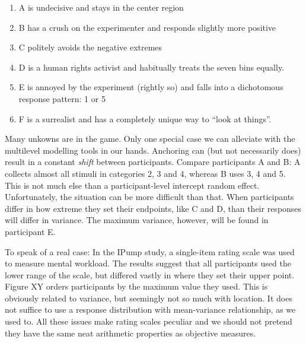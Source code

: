 \documentclass[]{svmono}
\providecommand{\tightlist}{%
  \setlength{\itemsep}{0pt}\setlength{\parskip}{0pt}}
\begin{document}
\begin{enumerate}
\def\labelenumi{\arabic{enumi}.}
\tightlist
\item
  A is undecisive and stays in the center region
\item
  B has a crush on the experimenter and responds slightly more positive
\item
  C politely avoids the negative extremes
\item
  D is a human rights activist and habitually treats the seven bins
  equally.
\item
  E is annoyed by the experiment (rightly so) and falls into a
  dichotomous response pattern: 1 or 5
\item
  F is a surrealist and has a completely unique way to ``look at
  things''.
\end{enumerate}

Many unkowns are in the game. Only one special case we can alleviate
with the multilevel modelling tools in our hands. Anchoring can (but not
necessarily does) result in a constant \emph{shift} between
participants. Compare participants A and B: A collects almost all
stimuli in categories 2, 3 and 4, whereas B uses 3, 4 and 5. This is not
much else than a participant-level intercept random effect.
Unfortunately, the situation can be more difficult than that. When
participants differ in how extreme they set their endpoints, like C and
D, than their responses will differ in variance. The maximum variance,
however, will be found in participant E.

To speak of a real case: In the IPump study, a single-item rating scale
was used to measure mental workload. The results suggest that all
participants used the lower range of the scale, but differed vastly in
where they set their upper point. Figure XY orders participants by the
maximum value they used. This is obviously related to variance, but
seemingly not so much with location. It does not suffice to use a
response distribution with mean-variance relationship, as we used to.
All these issues make rating scales peculiar and we should not pretend
they have the same neat arithmetic properties as objective measures.
\end{document}
